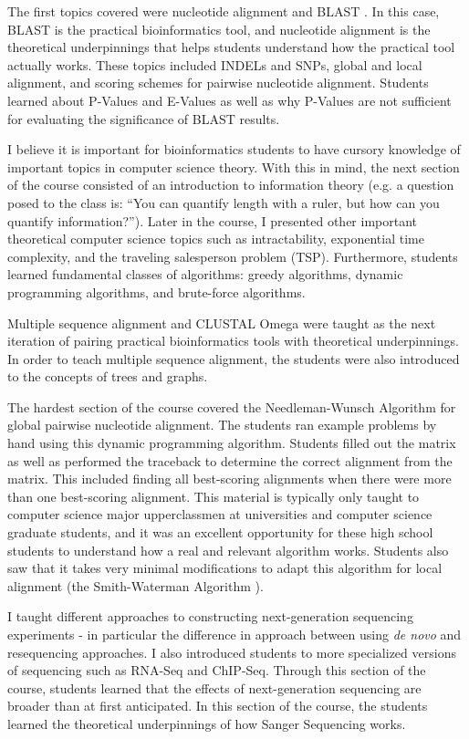 \documentclass{report}
\begin{document}
The first topics covered were nucleotide alignment and BLAST  \cite{altschul1990basic}. In this case, BLAST is the practical bioinformatics tool, and nucleotide alignment is the theoretical underpinnings that helps students understand how the practical tool actually works. These topics included INDELs and SNPs, global and local alignment, and scoring schemes for pairwise nucleotide alignment. Students learned about P-Values and E-Values as well as why P-Values are not sufficient for evaluating the significance of BLAST results. 

I believe it is important for bioinformatics students to have cursory knowledge of important topics in computer science theory. With this in mind, the next section of the course consisted of an introduction to information theory (e.g. a question posed to the class is: ``You can quantify length with a ruler, but how can you quantify information?''). Later in the course, I presented other important theoretical computer science topics such as intractability, exponential time complexity, and the traveling salesperson problem (TSP). Furthermore, students learned fundamental classes of algorithms: greedy algorithms, dynamic programming algorithms, and brute-force algorithms. 

Multiple sequence alignment and CLUSTAL Omega \cite{sievers2011fast} were taught as the next iteration of pairing practical bioinformatics tools with theoretical underpinnings. In order to teach multiple sequence alignment, the students were also introduced to the concepts of trees and graphs.

The hardest section of the course covered the Needleman-Wunsch Algorithm \cite{needleman1970general} for global pairwise nucleotide alignment. The students ran example problems by hand using this dynamic programming algorithm. Students filled out the matrix as well as performed the traceback to determine the correct alignment from the matrix. This included finding all best-scoring alignments when there were more than one best-scoring alignment. This material is typically only taught to computer science major upperclassmen at universities and computer science graduate students, and it was an excellent opportunity for these high school students to understand how a real and relevant algorithm works. Students also saw that it takes very minimal modifications to adapt this algorithm for local alignment (the Smith-Waterman Algorithm \cite{smith1981identification}).

I taught different approaches to constructing next-generation sequencing experiments - in particular the difference in approach between using \emph{de novo} and resequencing approaches. I also introduced students to more specialized versions of sequencing such as RNA-Seq and ChIP-Seq. Through this section of the course, students learned that the effects of next-generation sequencing are broader than at first anticipated. In this section of the course, the students learned the theoretical underpinnings of how Sanger Sequencing works.
\end{document}
